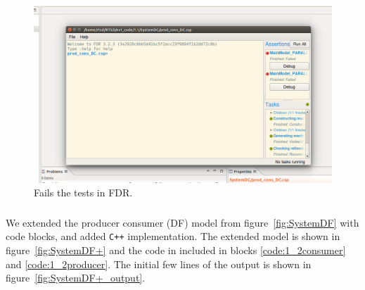 \documentclass[a4paper,twoside,11pt]{article}
\newcommand{\cpp}{{\tt C++} }
\begin{document}
\begin{figure}
 \centering
 \includegraphics[width=\textwidth]{./images/1_1-SystemDC.png}
 \caption{Fails the tests in FDR.}
 \label{fig:FDR_DC}
\end{figure}

\FloatBarrier
\subsubsection{}
We extended the producer consumer (DF) model from figure~\ref{fig:SystemDF} with code blocks, and added \cpp implementation. The extended model is shown in figure~\ref{fig:SystemDF+} and the code in included in blocks \ref{code:1_2consumer} and \ref{code:1_2producer}. The initial few lines of the output is shown in figure~\ref{fig:SystemDF+_output}.
\end{document}
